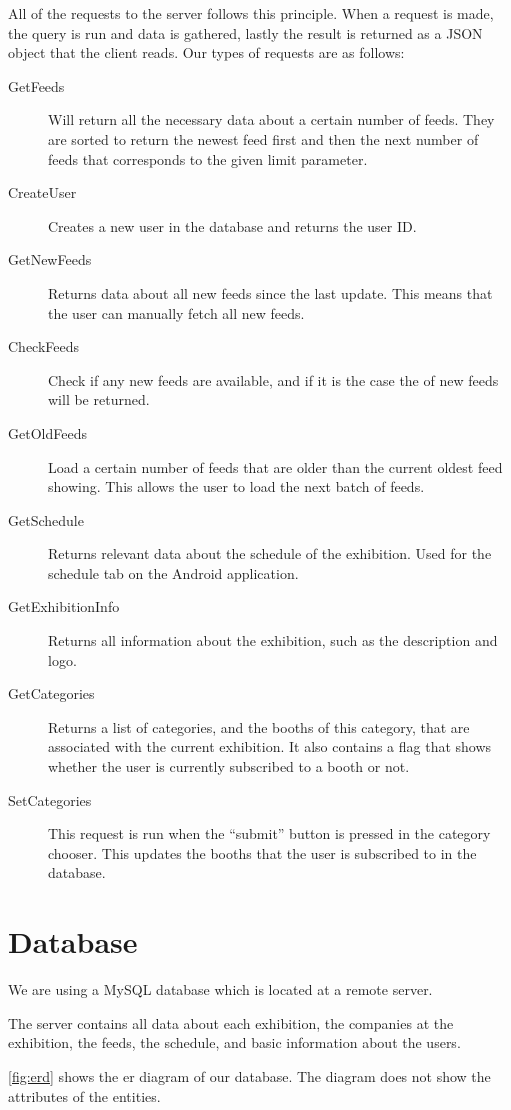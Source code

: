 All of the requests to the server follows this principle. When a request is made, the query is run and data is gathered, lastly the result is returned as a JSON object that the client reads. Our types of requests are as follows:
\begin{description}
\item[GetFeeds] Will return all the necessary data about a certain number of feeds. They are sorted to return the newest feed first and then the next number of feeds that corresponds to the given limit parameter.
\item[CreateUser] Creates a new user in the database and returns the user ID.
\item[GetNewFeeds] Returns data about all new feeds since the last update. This means that the user can manually fetch all new feeds.
\item[CheckFeeds] Check if any new feeds are available, and if it is the case the of new feeds will be returned.
\item[GetOldFeeds] Load a certain number of feeds that are older than the current oldest feed showing. This allows the user to load the next batch of feeds.
\item[GetSchedule] Returns relevant data about the schedule of the exhibition. Used for the schedule tab on the Android application.
\item[GetExhibitionInfo] Returns all information about the exhibition, such as the description and logo.
\item[GetCategories] Returns a list of categories, and the booths of this category, that are associated with the current exhibition. It also contains a flag that shows whether the user is currently subscribed to a booth or not.
\item[SetCategories] This request is run when the ``submit'' button is pressed in the category chooser. This updates the booths that the user is subscribed to in the database.
\end{description}

\section{Database}
We are using a MySQL database which is located at a remote server.

The server contains all data about each exhibition, the companies at the exhibition, the feeds, the schedule, and basic information about the users.

\autoref{fig:erd} shows the \ac{er} diagram of our database. The diagram does not show the attributes of the entities.


